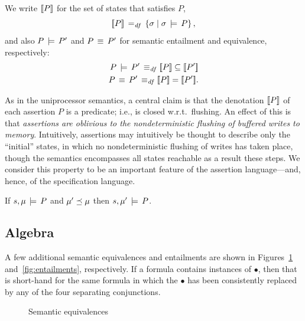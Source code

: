\documentclass[11pt]{report}
\begin{document}
We write $[\![P]\!]$ for the set of states that satisfies $P$,\[ [\![P]\!] \operatorname{\;=_{\mathit{df}}\;} \left\lbrace \sigma \mid \sigma \,\models\, P \right\rbrace,\] and also $P \,\models\, P'$ and $P \,\equiv\, P'$ for semantic entailment and equivalence, respectively: \begin{align*}
	P \sentails P' \iffdef \pred{P} \subseteq \pred{P'} \\
	P \sequiv P' \iffdef \pred{P} = \pred{P'}.
\end{align*} 

As in the uniprocessor semantics, a central claim is that the denotation $[\![P]\!]$ of each assertion $P$ is a predicate; i.e., is closed w.r.t.~flushing. An effect of this is that \emph{assertions are oblivious to the nondeterministic flushing of buffered writes to memory}. Intuitively, assertions may intuitively be thought to describe only the ``initial'' states, in which no nondeterministic flushing of writes has taken place, though the semantics encompasses all states reachable as a result these steps. We consider this property to be an important feature of the assertion language---and, hence, of the specification language. 

\begin{lemma}
	\label{lem:flushing-closure}
	If $s,\mu \,\models\, P$ and $\mu' \preceq \mu$ then $s,\mu' \,\models\, P$. 
\end{lemma}

\subsection{Algebra}
\label{sec:algebra}

A few additional semantic equivalences and entailments are shown in Figures~\ref{fig:equivalences} and~\ref{fig:entailments}, respectively. If a formula contains instances of $\bullet$, then that is short-hand for the same formula in which the $\bullet$ has been consistently replaced by any of the four separating conjunctions. 

\begin{figure}[ht]
	\centering
	\caption{\label{fig:equivalences}Semantic equivalences}
\end{figure}
\end{document}
